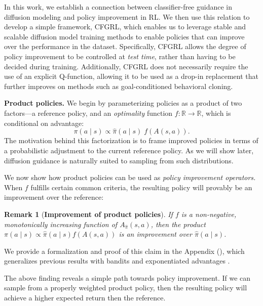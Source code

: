 \documentclass{article}
\newtheorem{remark}{Remark}
\begin{document}
In this work, we establish a connection between classifier-free guidance in diffusion modeling and policy improvement in RL. We then use this relation to develop a simple framework, CFGRL, which enables us to leverage stable and scalable diffusion model training methods to enable policies that can improve over the performance in the dataset. Specifically, CFGRL allows the degree of policy improvement to be controlled at \textit{test time}, rather than having to be decided during training. 
Additionally, CFGRL does not necessarily require the use of an explicit Q-function, allowing it to be used as a drop-in replacement that further improves on methods such as goal-conditioned behavioral cloning.

\textbf{Product policies.} We begin by parameterizing policies as a product of two factors---a reference policy, and an \textit{optimality} function $f: \mathbb{R} \rightarrow \mathbb{R}$, which is conditional on advantage:
\begin{equation}
    \pi(a \mid s) \propto \hat{\pi}(a \mid s)\; f(A(s,a)).
    \label{eq:product-policy}
\end{equation}
The motivation behind this factorization is to frame improved policies in terms of a probabilistic adjustment to the current reference policy. As we will show later, diffusion guidance is naturally suited to sampling from such distributions.

We now show how product policies can be used as \textit{policy improvement operators.} When $f$ fulfills certain common criteria, the resulting policy will provably be an improvement over the reference:
\begin{remark}[\textbf{Improvement of product policies}]
If $f$ is a non-negative, monotonically increasing function of $A_{\hat{\pi}}(s,a)$, then the product $\pi(a \mid s) \propto \hat{\pi}(a \mid s) f(A(s,a))$ is an improvement over $\hat{\pi}(a \mid s)$.
\label{thm:product_improvement}
\end{remark}
\vspace{-10pt}
We provide a formalization and proof of this claim in the Appendix (),
which generalizes previous results with bandits \citep{em_dayan1997, rwr_peters2007} and exponentiated advantages \citep{awr_peng2019}.

The above finding reveals a simple path towards policy improvement. If we can sample from a properly weighted product policy, then the resulting policy will achieve a higher expected return then the reference. 
\end{document}
